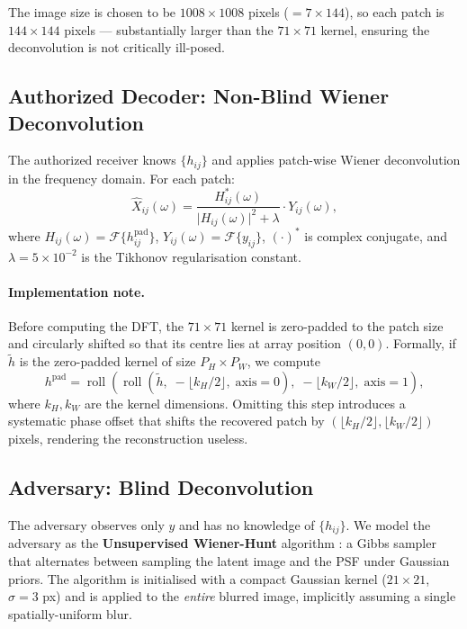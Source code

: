 \documentclass[11pt, a4paper]{article}
\begin{document}
The image size is chosen to be $1008\times 1008$ pixels ($= 7\times 144$),
so each patch is $144\times 144$ pixels --- substantially larger than the
$71\times 71$ kernel, ensuring the deconvolution is not critically ill-posed.

\subsection{Authorized Decoder: Non-Blind Wiener Deconvolution}
\label{ssec:nonblind}

The authorized receiver knows $\{h_{ij}\}$ and applies patch-wise Wiener
deconvolution in the frequency domain.  For each patch:
\begin{equation}
  \hat{X}_{ij}(\omega) =
    \frac{H_{ij}^*(\omega)}{\lvert H_{ij}(\omega)\rvert^2 + \lambda}
    \cdot Y_{ij}(\omega),
  \label{eq:wiener}
\end{equation}
where $H_{ij}(\omega) = \mathcal{F}\{h_{ij}^{\text{pad}}\}$,
$Y_{ij}(\omega) = \mathcal{F}\{y_{ij}\}$, $(\cdot)^*$ is complex conjugate,
and $\lambda = 5\times 10^{-2}$ is the Tikhonov regularisation constant.

\paragraph{Implementation note.}
Before computing the DFT, the $71\times 71$ kernel is zero-padded to the
patch size and circularly shifted so that its centre lies at array position
$(0,0)$.  Formally, if $\tilde{h}$ is the zero-padded kernel of size
$P_H\times P_W$, we compute
\begin{equation}
  h^{\text{pad}} = \operatorname{roll}\!\left(
    \operatorname{roll}(\tilde{h},\; -\lfloor k_H/2\rfloor,\; \text{axis}=0),\;
    -\lfloor k_W/2\rfloor,\; \text{axis}=1
  \right),
  \label{eq:roll}
\end{equation}
where $k_H, k_W$ are the kernel dimensions.  Omitting this step introduces a
systematic phase offset that shifts the recovered patch by $(\lfloor k_H/2\rfloor,
\lfloor k_W/2\rfloor)$ pixels, rendering the reconstruction useless.

\subsection{Adversary: Blind Deconvolution}
\label{ssec:blind}

The adversary observes only $y$ and has no knowledge of $\{h_{ij}\}$.  We
model the adversary as the \textbf{Unsupervised Wiener-Hunt} algorithm
\cite{orieux2010bayesian}: a Gibbs sampler that alternates between sampling
the latent image and the PSF under Gaussian priors.  The algorithm is
initialised with a compact Gaussian kernel ($21\times21$, $\sigma = 3$ px)
and is applied to the \emph{entire} blurred image, implicitly assuming a
single spatially-uniform blur.
\end{document}
